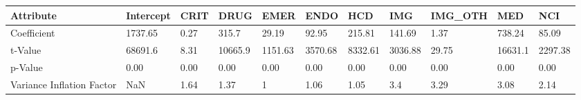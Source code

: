 \begin{tabular}{lllllllllll}
\toprule
Attribute & Intercept &  CRIT &     DRUG &     EMER &     ENDO &      HCD &      IMG & IMG\_OTH &      MED &      NCI \\
\midrule
Coefficient               &   1737.65 &  0.27 &    315.7 &    29.19 &    92.95 &   215.81 &   141.69 &    1.37 &   738.24 &    85.09 \\
t-Value                   &   68691.6 &  8.31 &  10665.9 &  1151.63 &  3570.68 &  8332.61 &  3036.88 &   29.75 &  16631.1 &  2297.38 \\
p-Value                   &      0.00 &  0.00 &     0.00 &     0.00 &     0.00 &     0.00 &     0.00 &    0.00 &     0.00 &     0.00 \\
Variance Inflation Factor &       NaN &  1.64 &     1.37 &        1 &     1.06 &     1.05 &      3.4 &    3.29 &     3.08 &     2.14 \\
\bottomrule
\end{tabular}
